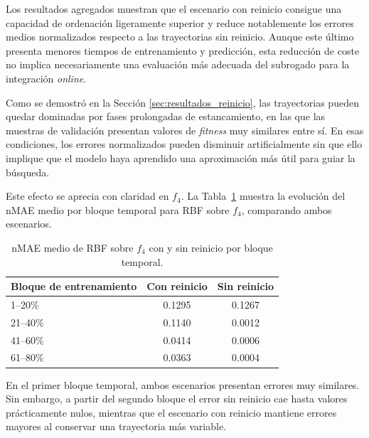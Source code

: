 Los resultados agregados muestran que el escenario con reinicio consigue una capacidad de ordenación ligeramente superior y reduce notablemente los errores medios normalizados respecto a las trayectorias sin reinicio. Aunque este último presenta menores tiempos de entrenamiento y predicción, esta reducción de coste no implica necesariamente una evaluación más adecuada del subrogado para la integración \textit{online}.

Como se demostró en la Sección \ref{sec:resultados_reinicio}, las trayectorias pueden quedar dominadas por fases prolongadas de estancamiento, en las que las muestras de validación presentan valores de \textit{fitness} muy similares entre sí. En esas condiciones, los errores normalizados pueden disminuir artificialmente sin que ello implique que el modelo haya aprendido una aproximación más útil para guiar la búsqueda.

Este efecto se aprecia con claridad en \(f_4\). La Tabla~\ref{tab:ejemplo_f4_sin_reinicio} muestra la evolución del
nMAE medio por bloque temporal para RBF sobre \(f_4\), comparando ambos
escenarios.

\begin{table}[H]
    \centering
    \small
    \begin{tabular}{lcc}
        \toprule
        \textbf{Bloque de entrenamiento} & \textbf{Con reinicio} & \textbf{Sin reinicio} \\
        \midrule
        1--20\%                          & 0.1295                & 0.1267                \\
        21--40\%                         & 0.1140                & 0.0012                \\
        41--60\%                         & 0.0414                & 0.0006                \\
        61--80\%                         & 0.0363                & 0.0004                \\
        \bottomrule
    \end{tabular}
    \caption{nMAE medio de RBF sobre \(f_4\) con y sin reinicio por bloque temporal.}
    \label{tab:ejemplo_f4_sin_reinicio}
\end{table}

En el primer bloque temporal, ambos escenarios presentan errores muy similares. Sin embargo, a partir del segundo bloque el error sin reinicio cae hasta valores prácticamente nulos, mientras que el escenario con reinicio mantiene errores mayores al conservar una trayectoria más variable.

